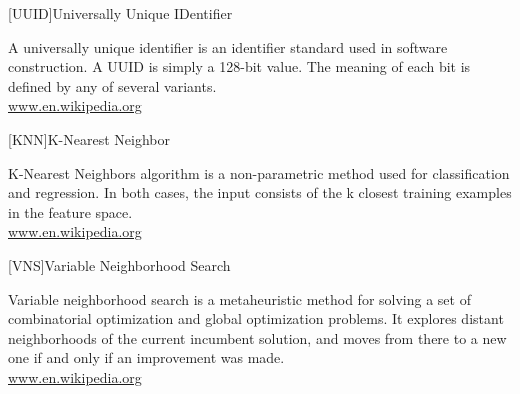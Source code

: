 \begin{acronym}[OpenFOAM]
[UUID]{Universally Unique IDentifier}

{\smaller A universally unique identifier is an identifier standard used in software construction. A UUID is simply a 128-bit value. The meaning of each bit is defined by any of several variants.\\
\href{https://en.wikipedia.org/wiki/Universally_unique_identifier}{www.en.wikipedia.org}
\par}

[KNN]{K-Nearest Neighbor}

{\smaller K-Nearest Neighbors algorithm is a non-parametric method used for classification and regression. In both cases, the input consists of the k closest training examples in the feature space.\\
\href{https://en.wikipedia.org/wiki/K-nearest_neighbors_algorithm}{www.en.wikipedia.org}
\par}

[VNS]{Variable Neighborhood Search}

{\smaller Variable neighborhood search is a metaheuristic method for solving a set of combinatorial optimization and global optimization problems. It explores distant neighborhoods of the current incumbent solution, and moves from there to a new one if and only if an improvement was made.\\
\href{https://en.wikipedia.org/wiki/Variable_neighborhood_search}{www.en.wikipedia.org}
\par}

\end{acronym}
%
